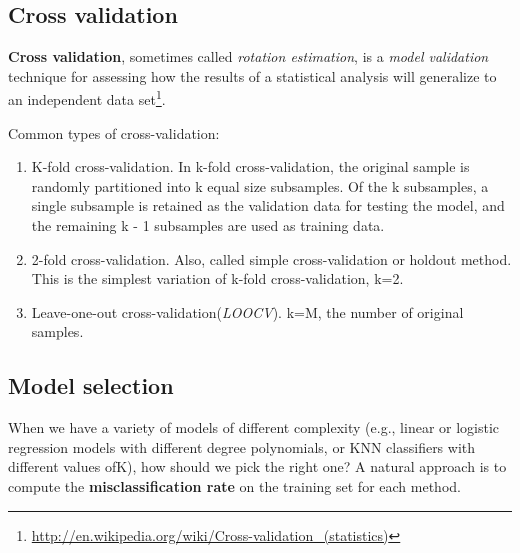 \subsection{Cross validation}
\label{sec:Cross-validation}
\begin{definition}
\textbf{Cross validation}, sometimes called \emph{rotation estimation}, is a \emph{model validation} technique for assessing how the results of a statistical analysis will generalize to an independent data set\footnote{\url{http://en.wikipedia.org/wiki/Cross-validation_(statistics)}}.
\end{definition}

Common types of cross-validation:
\begin{enumerate}
\item K-fold cross-validation. In k-fold cross-validation, the original sample is randomly partitioned into k equal size subsamples. Of the k subsamples, a single subsample is retained as the validation data for testing the model, and the remaining k - 1 subsamples are used as training data.
\item 2-fold cross-validation. Also, called simple cross-validation or holdout method. This is the simplest variation of k-fold cross-validation, k=2.
\item Leave-one-out cross-validation(\emph{LOOCV}). k=M, the number of original samples.
\end{enumerate}


\subsection{Model selection}
When we have a variety of models of different complexity (e.g., linear or logistic regression models with different degree polynomials, or KNN classifiers with different values ofK), how should we pick the right one? A natural approach is to compute the \textbf{misclassification rate} on the training set for each method.


